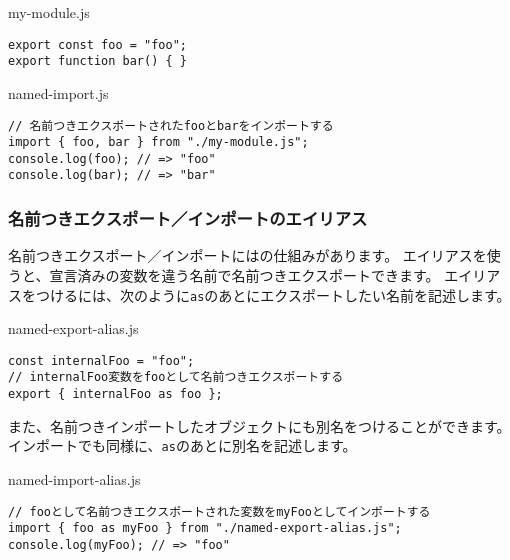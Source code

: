 \begin{listtitle}
my-module.js
\end{listtitle}
\begin{lstlisting}
export const foo = "foo";
export function bar() { }
\end{lstlisting}
\listend

\begin{listtitle}
named-import.js
\end{listtitle}
\begin{lstlisting}
// 名前つきエクスポートされたfooとbarをインポートする
import { foo, bar } from "./my-module.js";
console.log(foo); // => "foo"
console.log(bar); // => "bar"
\end{lstlisting}
\listend

\hypertarget{named-export-import-alias}{%
\subsubsection{名前つきエクスポート／インポートのエイリアス}\label{named-export-import-alias}}

名前つきエクスポート／インポートには\textbf{}の仕組みがあります。
エイリアスを使うと、宣言済みの変数を違う名前で名前つきエクスポートできます。
エイリアスをつけるには、次のように\texttt{as}のあとにエクスポートしたい名前を記述します。

\begin{listtitle}
named-export-alias.js
\end{listtitle}
\begin{lstlisting}
const internalFoo = "foo";
// internalFoo変数をfooとして名前つきエクスポートする
export { internalFoo as foo };
\end{lstlisting}
\listend

また、名前つきインポートしたオブジェクトにも別名をつけることができます。
インポートでも同様に、\texttt{as}のあとに別名を記述します。

\begin{listtitle}
named-import-alias.js
\end{listtitle}
\begin{lstlisting}
// fooとして名前つきエクスポートされた変数をmyFooとしてインポートする
import { foo as myFoo } from "./named-export-alias.js";
console.log(myFoo); // => "foo"
\end{lstlisting}
\listend

